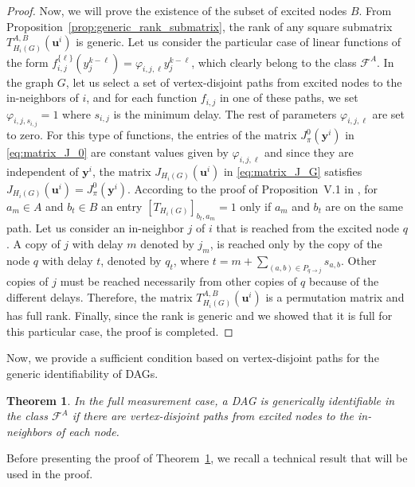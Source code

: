 \documentclass[letterpaper,10pt,journal]{IEEEtran}
\newcommand{\Fone}{\mathcal{F}^A}
\newcommand{\y}{\mathbf{y}}
\newcommand{\uu}{\mathbf{u}}
\newtheorem{theorem}{Theorem}
\begin{document}
\begin{proof}
\noindent    Now, we will prove the existence of the subset of excited nodes $B$.
    From Proposition~\ref{prop:generic_rank_submatrix}, the rank of
    any square submatrix $T_{H_i(G)}^{A,B}(\uu^i)$ is generic. Let us consider
    the particular case of linear functions of the form $f_{i,j}^{\{\ell\}}(y_j^{k-\ell})=\varphi_{i,j,\ell}y_j^{k-\ell}$, which clearly belong to the class $\Fone$. In the graph $G$, let us select a set of vertex-disjoint paths from excited nodes to the in-neighbors of $i$, and for each function $f_{i,j}$ in one of these paths, we set $\varphi_{i,j,s_{i,j}}=1$ where $s_{i,j}$ is the minimum delay. The rest of parameters $\varphi_{i,j,\ell}$ are set to zero. 
    For this type of functions, the entries of the matrix $J_\pi^0(\y^i)$ in \eqref{eq:matrix_J_0} are constant
    values given by $\varphi_{i,j,\ell}$ and since they 
    are independent of $\y^i$, the matrix $J_{H_i(G)}(\uu^i)$ 
    in \eqref{eq:matrix_J_G} satisfies $J_{H_i(G)}(\uu^i)=J_\pi^0(\y^i)$.  
    According to the proof of Proposition~V.1 in \cite{hendrickx2019identifiability}, for $a_m\in A$ and $b_t\in B$ an entry $[T_{H_i(G)}]_{b_t,a_m}=1$ only if $a_m$ and $b_t$ are on the same path. Let us consider an in-neighbor $j$ of $i$ that is reached from the excited node $q$.
    A copy of $j$ with delay $m$ denoted by $j_m$, is reached only by the copy of the node $q$ with delay $t$, denoted by $q_t$, where $t=m+\sum_{(a,b)\in P_{q\to j}}s_{a,b}$. Other copies of $j$ must be reached necessarily from other copies of $q$ because of the different delays. 
    Therefore, the matrix $T_{H_i(G)}^{A,B}(\uu^i)$ is a permutation matrix and has full rank. Finally,
    since the rank is generic and we showed that it is full for this particular case, the proof is completed.
\end{proof}



Now, we provide a sufficient condition based on vertex-disjoint paths for the generic identifiability of DAGs.

\begin{theorem}\label{thm:sufficiency}
    In the full measurement case, a DAG is generically identifiable in the class $\Fone$ if there are vertex-disjoint paths from excited nodes to the in-neighbors of each node.
\end{theorem}

Before presenting the proof of Theorem~\ref{thm:sufficiency}, we recall a
technical result that will be used in the proof.
\end{document}
